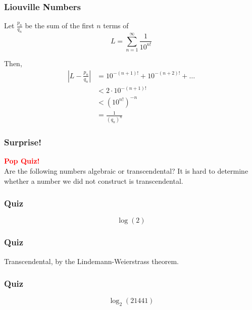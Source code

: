 \documentclass{beamer}
\begin{document}
    \begin{frame}
        \frametitle{Liouville Numbers}

        Let $\frac{p_n}{q_n}$ be the sum of the first $n$ terms of \[L = \sum\limits_{n=1}^{\infty}\frac{1}{10^{n!}}\]

        Then, 
        \begin{align*}
            \left\vert L - \frac{p_n}{q_n}\right\vert &= 10^{-(n+1)!} + 10^{-(n+2)!} + \ldots \\
                                           &< 2 \cdot 10^{-(n+1)!} \\
                                           &< {\left(10^{n!}\right)}^{-n} \\
                                           &= \frac{1}{{(q_n)}^{n}}
        \end{align*}

    \end{frame}

    \begin{frame}
        \frametitle{Surprise!}
        \begin{center}
            {\bfseries\huge{\textcolor{red}{Pop Quiz!}}} \\
            Are the following numbers algebraic or transcendental? It is hard to determine whether a number we did not construct is transcendental.
        \end{center}
    \end{frame}

    \begin{frame}
        \frametitle{Quiz}
        \begin{center}
            \[\log(2)\]
        \end{center}
    \end{frame}

    \begin{frame}
        \frametitle{Quiz}
        \begin{center}
            Transcendental, by the Lindemann-Weierstrass theorem.
        \end{center}
    \end{frame}
    \begin{frame}
        \frametitle{Quiz}
        \begin{center}
            \[\log_2(21441)\]
        \end{center}
    \end{frame}
\end{document}
